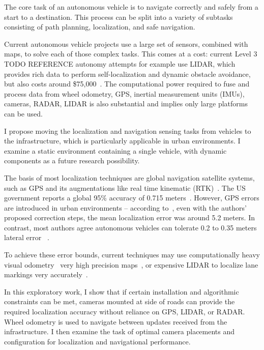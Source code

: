 \documentclass[a4paper,12pt,twoside,openright]{report}
\begin{document}
The core task of an autonomous vehicle is to navigate correctly and safely from a start
to a destination. This process can be split into a variety of subtasks consisting
of path planning, localization, and safe navigation.

Current autonomous vehicle projects use a large set of sensors, combined with
maps, to solve each of those complex tasks. This comes at a cost: current
Level 3 TODO REFERENCE autonomy attempts for example use LIDAR, which 
provides rich data to perform self-localization and dynamic obstacle avoidance,
but also costs around \$75,000~\cite{lin2018architectural}. The computational
power required to fuse and process data from wheel odometry,
GPS, inertial measurement units (IMUs), cameras, RADAR, LIDAR is also substantial
and implies only large platforms can be used.

I propose moving the localization and navigation sensing tasks
from vehicles to the infrastructure, which is particularly applicable in urban environments.
I examine a static environment containing a single vehicle, with dynamic components
as a future research possibility.

The basis of most localization techniques are global navigation satellite systems,
such as GPS and its augmentations like real time kinematic (RTK)~\cite{scherzinger2000precise}.
The US government reports a global 95\% accuracy of 0.715 meters~\cite{USGPSPerformance}. 
However, GPS errors are introduced in urban environments -- according to~\citeauthor{miura2015gps}, even with the
authors' proposed correction steps, the mean localization error was around 5.2 meters. 
In contrast, most authors agree autonomous vehicles can tolerate 0.2 to 0.35 meters lateral error
~\cite{vivacqua2017low}\cite{ziegler2014video}\cite{mattern2010high}.

To achieve these error bounds, current techniques may use computationally heavy visual odometry~\cite{ziegler2014video}
very high precision maps~\cite{mattern2010high}, or expensive LIDAR to localize
lane markings very accurately~\cite{hata2014road}.  

In this exploratory work, I show that if certain installation and algorithmic constraints
can be met, cameras mounted at side of roads can provide the required localization
accuracy without reliance on GPS, LIDAR, or RADAR. Wheel odometry is used to navigate
between updates received from the infrastructure. I then examine the task of 
optimal camera placements and configuration for localization and navigational performance.
\end{document}
